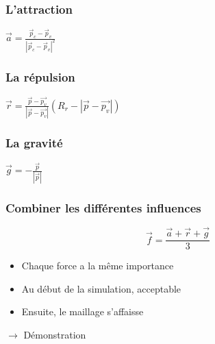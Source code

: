 \documentclass{beamer}
\begin{document}
\begin{frame}

  \frametitle{L'attraction}

  \begin{figure}
    
  \end{figure}

  \vfill

  \alert{$\vec{a} = \frac{\vec{p}_c - \vec{p}_v}{|\vec{p}_c - \vec{p}_v|^2}$}

\end{frame}

\begin{frame}

  \frametitle{La répulsion}

  \begin{figure}
    
  \end{figure}

  \vfill

  \alert{$\vec{r} = \frac{\vec{p} - \vec{p_v}}{|\vec{p} - \vec{p_v}|}(R_r - |\vec{p} - \vec{p_v}|)$}

\end{frame}

\begin{frame}

  \frametitle{La gravité}

  \begin{figure}
    
  \end{figure}

  \vfill

  \alert{$\vec{g} = -\frac{\vec{p}}{|\vec{p}|}$}

\end{frame}

\begin{frame}

  \frametitle{Combiner les différentes influences}

  \begin{equation}
    \vec{f} = \frac{\vec{a} + \vec{r} + \vec{g}}{3}
  \end{equation}

  \vfill

  \begin{block}{}
    \begin{itemize}
    \item{Chaque force a la même importance}
    \item{Au début de la simulation, acceptable}
    \item{Ensuite, le maillage s'affaisse}
    \end{itemize}
  \end{block}

  \vfill

  $\rightarrow$ Démonstration

\end{frame}
\end{document}
